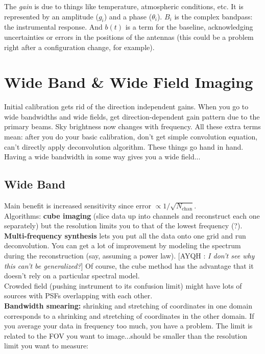 \documentclass[a4paper]{article}
\newcommand{\Comment}[2]{ [{\color{red}\sc #1 :} {{\color{cyan} \it #2}}]}
\begin{document}
The \emph{gain} is due to things like temperature, atmospheric conditions, etc. It is represented by an amplitude ($g_i$) and a phase ($\theta_i$). $B_i$ is the complex bandpass: the instrumental response. And $b(t)$ is a term for the baseline, acknowledging uncertainties or errors in the positions of the antennas (this could be a problem right after a configuration change, for example).

\section{Wide Band \& Wide Field Imaging}

Initial calibration gets rid of the direction independent gains.
When you go to wide bandwidths and wide fields, get direction-dependent gain pattern due to the primary beams. Sky brightness now changes with frequency. All these extra terms mean: after you do your basic calibration, don't get simple convolution equation, can't directly apply deconvolution algorithm.
These things go hand in hand. Having a wide bandwidth in some way gives you a wide field...

\subsection{Wide Band}

Main benefit is increased sensitivity since error $\propto 1/\sqrt{N_\mathrm{chan}}$. \\

Algorithms: \textbf{cube imaging} (slice data up into channels and reconstruct each one separately) but the resolution limits you to that of the lowest frequency (?). \textbf{Multi-frequency synthesis} lets you put all the data onto one grid and run deconvolution. You can get a lot of improvement by modeling the spectrum during the reconstruction (say, assuming a power law). \Comment{AYQH}{I don't see why this can't be generalized?} Of course, the cube method has the advantage that it doesn't rely on a particular spectral model. \\

Crowded field (pushing instrument to its confusion limit) might have lots of sources with PSFs overlapping with each other. \\

\textbf{Bandwidth smearing:} shrinking and stretching of coordinates in one domain corresponds to a shrinking and stretching of coordinates in the other domain. If you average your data in frequency too much, you have a problem. The limit is related to the FOV you want to image...should be smaller than the resolution limit you want to measure:
\end{document}
